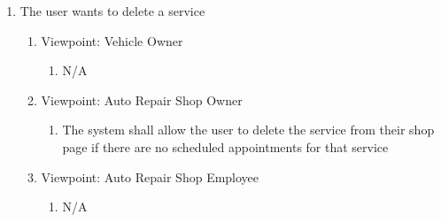 \documentclass[12pt]{article}
\begin{document}
\begin{enumerate}[resume*=business_events]
	\item The user wants to delete a service
	      \begin{enumerate}[VP\arabic*.]
		      \item Viewpoint: Vehicle Owner
		            \begin{enumerate}
			            \item[] N/A
		            \end{enumerate}
		      \item Viewpoint: Auto Repair Shop Owner
		            \begin{enumerate}
			            \item The system shall allow the user to delete the service from their shop page if there are no
			                  scheduled appointments for that service
		            \end{enumerate}
		      \item Viewpoint: Auto Repair Shop Employee
		            \begin{enumerate}
			            \item[] N/A
		            \end{enumerate}
	      \end{enumerate}
\end{enumerate}
\end{document}
